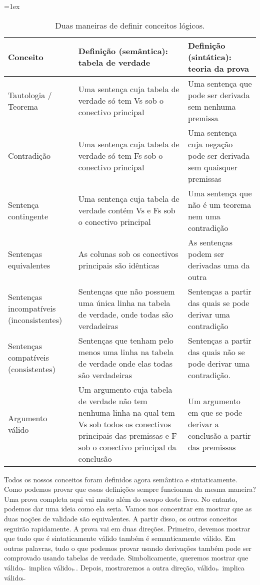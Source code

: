\begin{sidewaystable}\small
\tabulinesep=1ex
\begin{tabu}{X[.5,c,m] ||X[1,l,m] |X[1,l,m]}
\textbf{Conceito} 		&	\textbf{Definição (semântica): tabela de verdade} 	&	\textbf{ Definição  (sintática):  teoria da prova} \\ \hline \hline

Tautologia / Teorema  &	Uma sentença cuja tabela de verdade só tem Vs sob o conectivo principal  & Uma sentença que pode ser derivada sem nenhuma premissa	 \\ \hline
 
Contradição		&	Uma sentença cuja tabela de verdade só tem Fs sob o conectivo principal  &	Uma sentença cuja negação pode ser derivada sem quaisquer premissas\\ \hline

Sentença contingente	&	Uma sentença cuja tabela de verdade contém Vs e Fs sob o  conectivo principal & Uma sentença que não é um teorema nem uma contradição \\ \hline

Sentenças equivalentes  &	As colunas sob os conectivos principais são idênticas & As sentenças podem ser derivadas uma da outra	\\ \hline

Sentenças  incompatíveis (inconsistentes)	&	Sentenças que não possuem uma única linha na tabela de verdade, onde todas são verdadeiras	& Sentenças a partir das quais se pode derivar uma contradição \\ \hline

Sentenças  compatíveis (consistentes)	&	Sentenças que tenham pelo menos uma linha na tabela de verdade onde elas todas são verdadeiras & Sentenças  a partir das quais não se pode derivar uma contradição.	\\ \hline

Argumento válido 		&	Um argumento cuja tabela de verdade não tem  nenhuma linha  na qual  tem Vs sob todos os conectivos principais das premissas e F sob o conectivo principal da conclusão  & Um argumento em que se pode derivar a conclusão a partir das premissas	\\ 
\end{tabu}
\caption{Duas maneiras de definir conceitos lógicos.}
\label{table:truth_tables_or_derivations}
\end{sidewaystable}


Todos os nossos conceitos foram definidos agora semântica e sintaticamente. Como podemos provar que essas definições sempre funcionam da mesma maneira? Uma prova completa aqui vai muito além do escopo deste livro. No entanto, podemos dar uma ideia como ela seria. Vamos nos concentrar em mostrar que as duas noções de validade são equivalentes. A partir disso, os outros conceitos seguirão rapidamente. A  prova vai em duas direções. Primeiro, devemos mostrar que tudo que é sintaticamente válido também é semanticamente válido.  
Em outras palavras, tudo o que podemos provar usando derivações também pode ser comprovado usando tabelas de verdade. Simbolicamente,  queremos mostrar que  válido$_{\vdash}$ implica válido$_{\vDash}$. Depois, mostraremos a outra  direção, válido$_{\vDash}$ implica válido$_{\vdash}$


